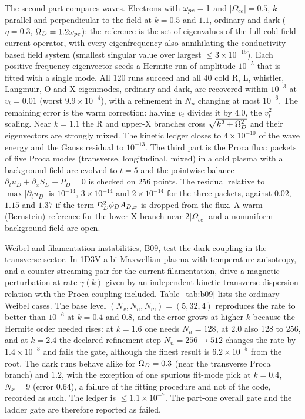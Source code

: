 The second part compares waves. Electrons with $\omega_{pe}=1$ and $|\Omega_{ce}|=0.5$, $k$ parallel and perpendicular to the field at $k=0.5$ and $1.1$, ordinary and dark ($\eta=0.3$, $\Omega_D=1.2\omega_{pe}$): the reference is the set of eigenvalues of the full cold field-current operator, with every eigenfrequency also annihilating the conductivity-based field system (smallest singular value over largest $\le3\times10^{-15}$). Each positive-frequency eigenvector seeds a Hermite run of amplitude $10^{-5}$ that is fitted with a single mode. All 120 runs succeed and all 40 cold R, L, whistler, Langmuir, O and X eigenmodes, ordinary and dark, are recovered within $10^{-3}$ at $v_t=0.01$ (worst $9.9\times10^{-4}$), with a refinement in $N_n$ changing at most $10^{-6}$. The remaining error is the warm correction: halving $v_t$ divides it by $4.0$, the $v_t^2$ scaling. Near $k=1.1$ the R and upper-X branches cross $\sqrt{k^2+\Omega_D^2}$ and their eigenvectors are strongly mixed. The kinetic ledger closes to $4\times10^{-10}$ of the wave energy and the Gauss residual to $10^{-13}$. The third part is the Proca flux: packets of five Proca modes (transverse, longitudinal, mixed) in a cold plasma with a background field are evolved to $t=5$ and the pointwise balance $\partial_tu_D+\partial_xS_D+P_D=0$ is checked on 256 points. The residual relative to $\max|\partial_tu_D|$ is $10^{-14}$, $3\times10^{-14}$ and $2\times10^{-14}$ for the three packets, against $0.02$, $1.15$ and $1.37$ if the term $\Omega_D^2\phi_D A_{D,x}$ is dropped from the flux. A warm (Bernstein) reference for the lower X branch near $2|\Omega_{ce}|$ and a nonuniform background field are open.

Weibel and filamentation instabilities, B09, test the dark coupling in the transverse sector. In 1D3V a bi-Maxwellian plasma with temperature anisotropy, and a counter-streaming pair for the current filamentation, drive a magnetic perturbation at rate $\gamma(k)$ given by an independent kinetic transverse dispersion relation with the Proca coupling included. Table~\ref{tab:b09} lists the ordinary Weibel cases. The base level $(N_x,N_n,N_m)=(5,32,4)$ reproduces the rate to better than $10^{-6}$ at $k=0.4$ and $0.8$, and the error grows at higher $k$ because the Hermite order needed rises: at $k=1.6$ one needs $N_n=128$, at $2.0$ also 128 to 256, and at $k=2.4$ the declared refinement step $N_n=256\to512$ changes the rate by $1.4\times10^{-3}$ and fails the gate, although the finest result is $6.2\times10^{-5}$ from the root. The dark runs behave alike for $\Omega_D=0.3$ (near the transverse Proca branch) and $1.2$, with the exception of one spurious fit-mode pick at $k=0.4$, $N_x=9$ (error $0.64$), a failure of the fitting procedure and not of the code, recorded as such. The ledger is $\le1.1\times10^{-7}$. The part-one overall gate and the ladder gate are therefore reported as failed.

